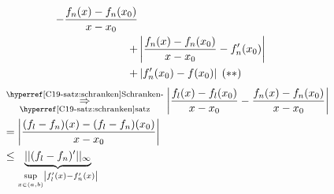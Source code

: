\documentclass[../ana1.tex]{subfiles}
\begin{document}
\begin{bew}
\begin{align*}
{        - \frac{f_n(x)-f_n(x_0)}{x-x_0} } \\
        + &\left| \frac{f_n(x)-f_n(x_0)}{x-x_0} 
        - f_n'(x_0) \right| \\
        + &\left| f_n'(x_0)
        - f(x_0) \right| \; (**)
    \end{align*}
    \begin{align*}
        &\overunderref{C19-satz:schranken}{Schranken-}{satz}{\Rightarrow}
        \abs{\frac{f_l(x)-f_l(x_0)}{x-x_0}-\frac{f_n(x)-f_n(x_0)}{x-x_0}} \\
        &= \abs{\frac{(f_l-f_n)(x)-(f_l - f_n)(x_0)}{x-x_0}} \\
        &\leq \underbrace{||(f_l-f_n)'||_\infty}_
        {\underset{x \in (a,b)}{\sup} \abs{f_l'(x)-f_n'(x)}}
    \end{align*}
\end{bew}
\end{document}
